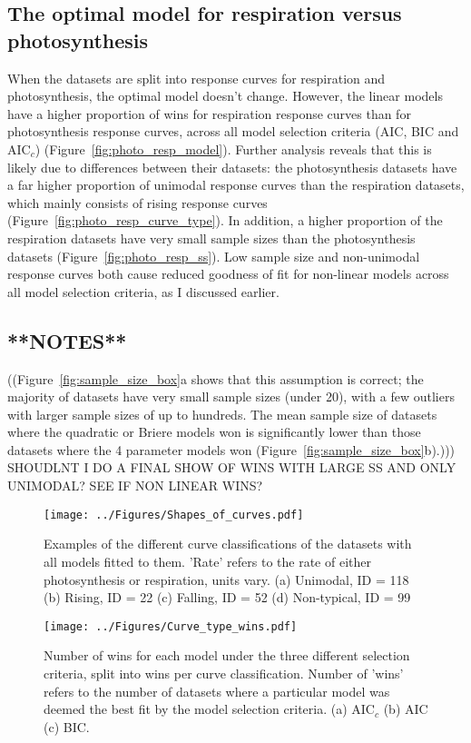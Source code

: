 \documentclass[11pt]{article}
\begin{document}
\subsection{The optimal model for respiration versus photosynthesis}

When the datasets are split into response curves for respiration and photosynthesis, the optimal model doesn't change. However, the linear models have a higher proportion of wins for respiration response curves than for photosynthesis response curves, across all model selection criteria (AIC, BIC and AIC$_c$) (Figure~\ref{fig:photo_resp_model}). Further analysis reveals that this is likely due to differences between their datasets: the photosynthesis datasets have a far higher proportion of unimodal response curves than the respiration datasets, which mainly consists of rising response curves (Figure~\ref{fig:photo_resp_curve_type}). In addition, a higher proportion of the respiration datasets have very small sample sizes than the photosynthesis datasets (Figure~\ref{fig:photo_resp_ss}). Low sample size and non-unimodal response curves both cause reduced goodness of fit for non-linear models across all model selection criteria, as I discussed earlier.


\subsection{**NOTES**}
((Figure~\ref{fig:sample_size_box}a shows that this assumption is correct; the majority of datasets have very small sample sizes (under 20), with a few outliers with larger sample sizes of up to hundreds.
The mean sample size of datasets where the quadratic or Briere models won is significantly lower than those datasets where the 4 parameter models won (Figure~\ref{fig:sample_size_box}b).)))
SHOUDLNT I DO A FINAL SHOW OF WINS WITH LARGE SS AND ONLY UNIMODAL? SEE IF NON LINEAR WINS?


\begin{figure} [H]
	\texttt{[image: ../Figures/Shapes\_of\_curves.pdf]}
	\caption{\label{fig:curves} Examples of the different curve classifications of the datasets with all models fitted to them. 'Rate' refers to the rate of either photosynthesis or respiration, units vary. (a) Unimodal, ID = 118 (b) Rising, ID = 22 (c) Falling, ID = 52 (d) Non-typical, ID = 99}
\end{figure}

\begin{figure} [H]
	\centering
	\texttt{[image: ../Figures/Curve\_type\_wins.pdf]}
	\caption{\label{fig:wins_plot} Number of wins for each model under the three different selection criteria, split into wins per curve classification. Number of 'wins' refers to the number of datasets where a particular model was deemed the best fit by the model selection criteria. (a) AIC$_c$ (b) AIC (c) BIC.}	
\end{figure}
\end{document}
